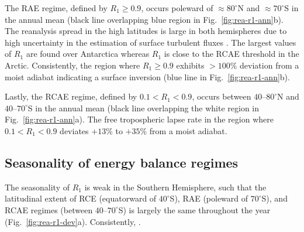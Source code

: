 \documentclass{ametsocV5}
\begin{document}
    The RAE regime, defined by $R_1 \ge 0.9$, occurs poleward of $\approx 80^\circ$N and $\approx 70^\circ$S in the annual mean (black line overlapping blue region in Fig.~\ref{fig:rea-r1-ann}b). The reanalysis spread in the high latitudes is large in both hemispheres due to high uncertainty in the estimation of surface turbulent fluxes \citep{tastula2013,graham2019}. The largest values of $R_1$ are found over Antarctica whereas $R_1$ is close to the RCAE threshold in the Arctic. Consistently, the region where $R_1\ge 0.9$ exhibits $>100\%$ deviation from a moist adiabat indicating a surface inversion (blue line in Fig.~\ref{fig:rea-r1-ann}b).

    Lastly, the RCAE regime, defined by $0.1 < R_1 < 0.9$, occurs between $40$--$80^\circ$N and $40$--$70^\circ$S in the annual mean (black line overlapping the white region in Fig.~\ref{fig:rea-r1-ann}a). The free tropospheric lapse rate in the region where $0.1 < R_1 < 0.9$ deviates $+13$\% to $+35$\% from a moist adiabat.

    \subsection{Seasonality of energy balance regimes} \label{subsec:seasonality}
    The seasonality of $R_1$ is weak in the Southern Hemisphere, such that the latitudinal extent of RCE (equatorward of $40^\circ$S), RAE (poleward of $70^\circ$S), and RCAE regimes (between $40$--$70^\circ$S) is largely the same throughout the year (Fig.~\ref{fig:rea-r1-dev}a). Consistently, .
\end{document}
